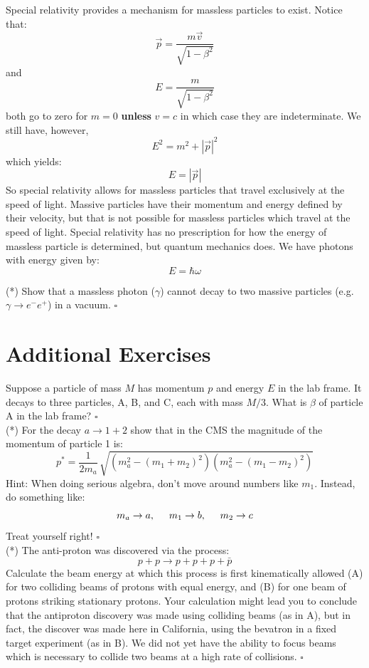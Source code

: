 \documentclass[12pt]{article}
\begin{document}
Special relativity provides a mechanism for massless particles to exist.  Notice that:
$$\vec{p}=\frac{m\vec{v}}{\sqrt{1-\beta^2}}$$
and
$$E=\frac{m}{\sqrt{1-\beta^2}}$$
both go to zero for $m=0$ {\bf unless} $v=c$ in which case they are indeterminate.  We still have, however,
$$E^2 = m^2 + |\vec{p}|^2$$
which yields:
$$E = |\vec{p}|$$
So special relativity allows for massless particles that travel
exclusively at the speed of light.  Massive particles have their momentum and energy defined by their velocity, but that is not possible for massless particles which travel at the speed of light.  Special relativity has no prescription for how the energy of massless particle is determined, but quantum mechanics does.  We have photons with energy given by:
$$E = \hbar \omega$$

\exercise (*)
Show that a massless photon ($\gamma$) cannot decay to two massive
particles (e.g. $\gamma \to e^- e^+$) in a vacuum. $\square$ \\[3pt]

\section{Additional Exercises}

\exercise 
Suppose a particle of mass $M$ has momentum $p$ and
energy $E$ in the lab frame.  It decays to three particles, A, B, and
C, each with mass $M/3$.  What is $\beta$ of particle A in the lab
frame? $\square$ \\[3pt]

\exercise(*)
For the decay $a \to 1 + 2$ show that in the CMS the magnitude of the momentum of particle 1 is:
$$p^* = \frac{1}{2m_a} \, \sqrt{\left(m_a^2-(m_1 + m_2)^2\right)\left(m_a^2-(m_1 - m_2)^2\right)}$$
Hint:  When doing serious algebra, don't move around numbers like $m_1$.  Instead, do something like:
$$m_a \to a, \hspace{0.5cm} m_1 \to b, \hspace{0.5cm} m_2 \to c$$
Treat yourself right! $\square$ \\[3pt]


\exercise (*)
The anti-proton was discovered via the process:
$$p + p \to p + p + p + \bar{p}$$ Calculate the beam energy at which
this process is first kinematically allowed (A) for two colliding
beams of protons with equal energy, and (B) for one beam of protons
striking stationary protons.  Your calculation might lead you to
conclude that the antiproton discovery was made using colliding beams
(as in A), but in fact, the discover was made here in California,
using the bevatron in a fixed target experiment (as in B).  We did not
yet have the ability to focus beams which is necessary to collide two
beams at a high rate of collisions. $\square$ \\[3pt]
\end{document}
